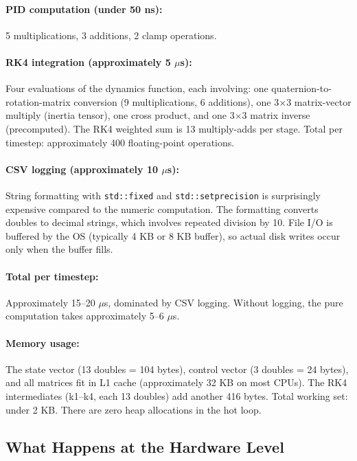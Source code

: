 \documentclass[12pt, a4paper]{article}
\begin{document}
\paragraph{PID computation (under 50 ns):}  5 multiplications, 3 additions, 2 clamp operations.

\paragraph{RK4 integration (approximately 5 $\mu$s):}  Four evaluations of the dynamics function, each involving: one quaternion-to-rotation-matrix conversion (9 multiplications, 6 additions), one 3$\times$3 matrix-vector multiply (inertia tensor), one cross product, and one 3$\times$3 matrix inverse (precomputed).  The RK4 weighted sum is 13 multiply-adds per stage.  Total per timestep: approximately 400 floating-point operations.

\paragraph{CSV logging (approximately 10 $\mu$s):}  String formatting with \texttt{std::fixed} and \texttt{std::setprecision} is surprisingly expensive compared to the numeric computation.  The formatting converts doubles to decimal strings, which involves repeated division by 10.  File I/O is buffered by the OS (typically 4 KB or 8 KB buffer), so actual disk writes occur only when the buffer fills.

\paragraph{Total per timestep:}  Approximately 15--20 $\mu$s, dominated by CSV logging.  Without logging, the pure computation takes approximately 5--6 $\mu$s.

\paragraph{Memory usage:}  The state vector (13 doubles = 104 bytes), control vector (3 doubles = 24 bytes), and all matrices fit in L1 cache (approximately 32 KB on most CPUs).  The RK4 intermediates (k1--k4, each 13 doubles) add another 416 bytes.  Total working set: under 2 KB.  There are zero heap allocations in the hot loop.

\subsection{What Happens at the Hardware Level}
\end{document}
